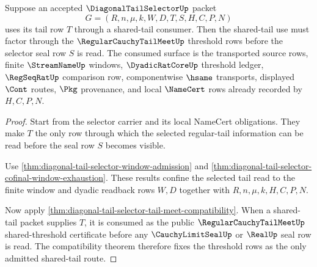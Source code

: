 \begin{theorem}
\label{thm:diagonal-tail-selector-regular-cauchy-tail-meet-consumption}
Suppose an accepted $\DiagonalTailSelectorUp$ packet
$$
G=(R,n,\mu,k,W,D,T,S,H,C,P,N)
$$
uses its tail row $T$ through a shared-tail consumer. Then the shared-tail use
must factor through the $\RegularCauchyTailMeetUp$ threshold rows before the
selector seal row $S$ is read. The consumed surface is the transported source
rows, finite $\StreamNameUp$ windows, $\DyadicRatCoreUp$ threshold ledger,
$\RegSeqRatUp$ comparison row, componentwise $\hsame$ transports, displayed
$\Cont$ routes, $\Pkg$ provenance, and local $\NameCert$ rows already
recorded by $H,C,P,N$.
\end{theorem}
\begin{proof}
Start from the selector carrier and its local NameCert obligations. They make
$T$ the only row through which the selected regular-tail information can be
read before the seal row $S$ becomes visible.

Use \autoref{thm:diagonal-tail-selector-window-admission} and
\autoref{thm:diagonal-tail-selector-cofinal-window-exhaustion}. These results
confine the selected tail read to the finite window and dyadic readback rows
$W,D$ together with $R,n,\mu,k,H,C,P,N$.

Now apply
\autoref{thm:diagonal-tail-selector-tail-meet-compatibility}. When a
shared-tail packet supplies $T$, it is consumed as the public
$\RegularCauchyTailMeetUp$ shared-threshold certificate before any
$\CauchyLimitSealUp$ or $\RealUp$ seal row is read. The compatibility theorem
therefore fixes the threshold rows as the only admitted shared-tail route.
\end{proof}

